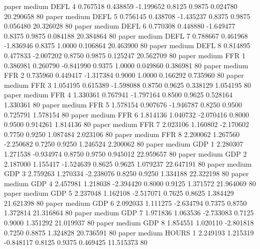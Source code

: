          paper     medium     DEFL                 4  0.767518 0.438859 -1.199652 0.8125 0.9875  0.024780   20.290658 80
         paper     medium     DEFL                 5  0.756145 0.438708 -1.435237 0.8375 0.9875  0.056480   20.326028 80
         paper     medium     DEFL                 6  0.770308 0.448880 -1.649477 0.8375 0.9875  0.084188   20.384864 80
         paper     medium     DEFL                 7  0.788667 0.461968 -1.836946 0.8375 1.0000  0.106864   20.463900 80
         paper     medium     DEFL                 8  0.814895 0.477833 -2.007202 0.8750 0.9875  0.125247   20.562709 80
         paper     medium      FFR                 1  0.386981 0.260790 -0.841990 0.9375 1.0000  0.049860    0.386981 80
         paper     medium      FFR                 2  0.735960 0.449417 -1.317384 0.9000 1.0000  0.166292    0.735960 80
         paper     medium      FFR                 3  1.054195 0.615389 -1.598088 0.8750 0.9625  0.338129    1.054195 80
         paper     medium      FFR                 4  1.330361 0.767941 -1.797164 0.8500 0.9625  0.528164    1.330361 80
         paper     medium      FFR                 5  1.578154 0.907676 -1.946787 0.8250 0.9500  0.725791    1.578154 80
         paper     medium      FFR                 6  1.814136 1.040732 -2.070416 0.8000 0.9500  0.914261    1.814136 80
         paper     medium      FFR                 7  2.023106 1.160802 -2.170602 0.7750 0.9250  1.087484    2.023106 80
         paper     medium      FFR                 8  2.200062 1.267560 -2.250682 0.7250 0.9250  1.246524    2.200062 80
         paper     medium      GDP                 1  2.280307 1.271538 -0.934974 0.8750 0.9750  0.945012   22.959657 80
         paper     medium      GDP                 2  2.187000 1.155417 -1.524639 0.8625 0.9625  1.079237   22.647191 80
         paper     medium      GDP                 3  2.759263 1.270334 -2.238076 0.8250 0.9250  1.334188   22.322198 80
         paper     medium      GDP                 4  2.457981 1.218038 -2.394420 0.8000 0.9125  1.371572   21.964069 80
         paper     medium      GDP                 5  2.237048 1.162108 -2.517071 0.7625 0.8625  1.384429   21.621398 80
         paper     medium      GDP                 6  2.092033 1.111275 -2.634794 0.7375 0.8750  1.372814   21.316864 80
         paper     medium      GDP                 7  1.971836 1.063536 -2.733083 0.7125 0.9000  1.351292   21.019937 80
         paper     medium      GDP                 8  1.854551 1.020110 -2.801818 0.7250 0.8875  1.324828   20.736591 80
         paper     medium    HOURS                 1  2.249193 1.215319 -0.848117 0.8125 0.9375  0.469425   11.515373 80
